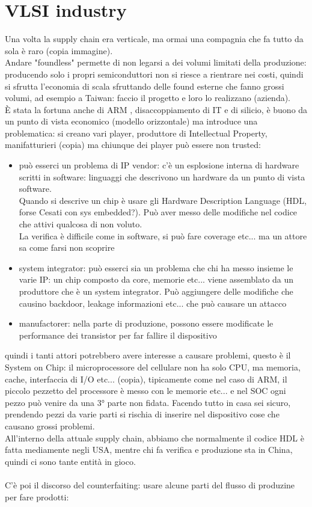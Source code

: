 \documentclass[oneside, 12pt]{extbook}
\begin{document}
\section{VLSI industry}
Una volta la supply chain era verticale, ma ormai una compagnia che fa tutto da sola è raro (copia immagine).\\Andare "foundless" permette di non legarsi a dei volumi limitati della produzione: producendo solo i propri semiconduttori non si riesce a rientrare nei costi, quindi si sfrutta l'economia di scala sfruttando delle found esterne che fanno grossi volumi, ad esempio a Taiwan: faccio il progetto e loro lo realizzano (azienda).\\È stata la fortuna anche di ARM , disaccoppiamento di IT e di silicio, è buono da un punto di vista economico (modello orizzontale) ma introduce una problematica: si creano vari player, produttore di Intellectual Property, manifatturieri (copia) ma chiunque dei player può essere non trusted:
\begin{itemize}
	\item può esserci un problema di IP vendor: c'è un esplosione interna di hardware scritti in software: linguaggi che descrivono un hardware da un punto di vista software.\\Quando si descrive un chip è usare gli Hardware Description Language (HDL, forse Cesati con sys embedded?). Può aver messo delle modifiche nel codice che attivi qualcosa di non voluto.\\La verifica è difficile come in software, si può fare coverage etc... ma un attore sa come farsi non scoprire
	\item system integrator: può esserci sia un problema che chi ha messo insieme le varie IP: un chip composto da core, memorie etc... viene assemblato da un produttore che è un system integrator. Può aggiungere delle modifiche che causino backdoor, leakage informazioni etc... che può causare un attacco
	\item manufactorer: nella parte di produzione, possono essere modificate le performance dei transistor per far fallire il dispositivo
\end{itemize}
quindi i tanti attori potrebbero avere interesse a causare problemi, questo è il System on Chip: il microprocessore del cellulare non ha solo CPU, ma memoria, cache, interfaccia di I/O etc... (copia), tipicamente come nel caso di ARM, il piccolo pezzetto del processore è messo con le memorie etc... e nel SOC ogni pezzo può venire da una 3° parte non fidata. Facendo tutto in casa sei sicuro, prendendo pezzi da varie parti si rischia di inserire nel dispositivo cose che causano grossi problemi.\\All'interno della attuale supply chain, abbiamo che normalmente il codice HDL è fatta mediamente negli USA, mentre chi fa verifica e produzione sta in China, quindi ci sono tante entità in gioco.\\\\C'è poi il discorso del counterfaiting: usare alcune parti del flusso di produzine per fare prodotti:
\end{document}

